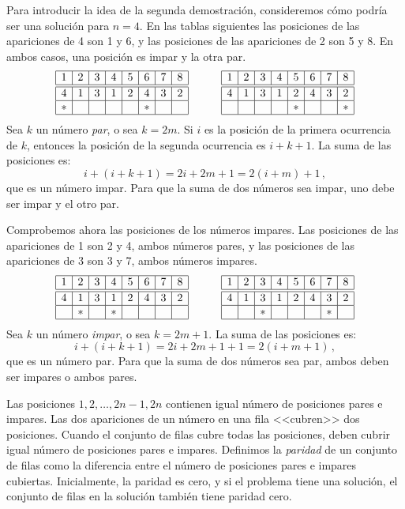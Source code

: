 Para introducir la idea de la segunda demostración, consideremos cómo podría ser una solución para $n=4$. En las tablas siguientes las posiciones de las apariciones de 4 son 1 y 6, y las posiciones de las apariciones de 2 son 5 y 8. En ambos casos, una posición es impar y la otra par.
\[
\begin{array}{|c|c|c|c|c|c|c|c|}
\hline
1&2&3&4&5&6&7&8\\
\hline\hline
4&1&3&1&2&4&3&2\\\hline
*&&&&&*&&\\\hline
\end{array}
\hspace{3em}
\begin{array}{|c|c|c|c|c|c|c|c|}
\hline
1&2&3&4&5&6&7&8\\
\hline\hline
4&1&3&1&2&4&3&2\\\hline
&&&&*&&&*\\\hline
\end{array}
\]
Sea $k$ un número \emph{par}, o sea $k=2m$. Si $i$ es la posición de la primera ocurrencia de $k$, entonces la posición de la segunda ocurrencia es $i+k+1$.
La suma de las posiciones es:
\[
i+(i+k+1)=2i+2m+1=2(i+m)+1\,,
\]
que es un número impar. Para que la suma de dos números sea impar, uno debe ser impar y el otro par.

Comprobemos ahora las posiciones de los números impares. Las posiciones de las apariciones de 1 son 2 y 4, ambos números pares, y las posiciones de las apariciones de 3 son 3 y 7, ambos números impares.
\[
\begin{array}{|c|c|c|c|c|c|c|c|}
\hline
1&2&3&4&5&6&7&8\\
\hline\hline
4&1&3&1&2&4&3&2\\\hline
&*&&*&&&&\\\hline
\end{array}
\hspace{3em}
\begin{array}{|c|c|c|c|c|c|c|c|}
\hline
1&2&3&4&5&6&7&8\\
\hline\hline
4&1&3&1&2&4&3&2\\\hline
&&*&&&&*&\\\hline
\end{array}
\]
Sea $k$ un número \emph{impar}, o sea $k=2m+1$. La suma de las posiciones es:
\[
i+(i+k+1)=2i+2m+1+1=2(i+m+1)\,,
\]
que es un número par. Para que la suma de dos números sea par, ambos deben ser impares o ambos pares.

Las posiciones $1,2,\ldots,2n-1,2n$ contienen igual número de posiciones pares e impares. Las dos apariciones de un número en una fila <<cubren>> dos posiciones. Cuando el conjunto de filas cubre todas las posiciones, deben cubrir igual número de posiciones pares e impares. Definimos la \emph{paridad} de un conjunto de filas como la diferencia entre el número de posiciones pares e impares cubiertas. Inicialmente, la paridad es cero, y si el problema tiene una solución, el conjunto de filas en la solución también tiene paridad cero.

